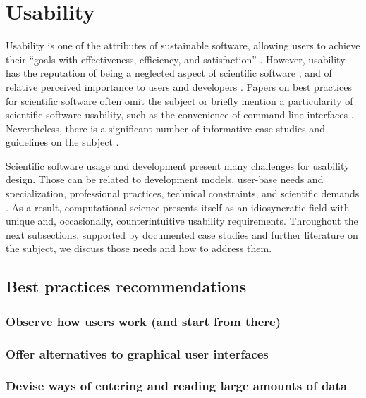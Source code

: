 \section{Usability}
\label{sec:usability}

Usability is one of the attributes of sustainable software, allowing users to achieve their “goals with effectiveness, efficiency, and satisfaction” \cite[p.3]{Venters_WSSSPE}. However, usability has the reputation of being a neglected aspect of scientific software \cite{Ahmed:2014}, and of relative perceived importance to users and developers \cite{Nguyen-Hoan:2010, Hucka:2016}. Papers on best practices for scientific software often omit the subject \cite{Stodden_WSSSPE, Wilson:2016} or briefly mention a particularity of scientific software usability, such as the convenience of command-line interfaces \cite{bestprSC}. Nevertheless, there is a significant number of informative case studies and guidelines on the subject \cite{Springmeyer:1993, Pancake:1996, Javahery:2004, Schraefel:2004,Letondal:2004, Talbott:2005, Macaulay:2009, DeRoure:2009, Keefe:2010, DeMatos:2013, Ahmed:2014}.

Scientific software usage and development present many challenges for usability design. Those can be related to development models, user-base needs and specialization, professional practices, technical constraints, and scientific demands \cite{Queiroz:2016}. As a result, computational science presents itself as an idiosyncratic field with unique and, occasionally, counterintuitive usability requirements. Throughout the next subsections, supported by documented case studies and further literature on the subject, we discuss those needs and how to address them. 

\subsection{Best practices recommendations}

\subsubsection{Observe how users work (and start from there)}

\subsubsection{Offer alternatives to graphical user interfaces}

\subsubsection{Devise ways of entering and reading large amounts of data}

